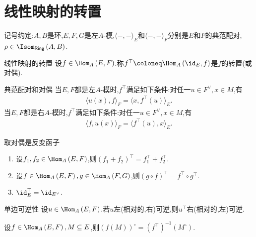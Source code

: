 \section{线性映射的转置}

记号约定:$A,B$是环,$E,F,G$是左$A$-模,$\langle -,-\rangle_{E}$和$\langle -,-\rangle_{F}$分别是$E$和$F$的典范配对,$\rho\in\Isom_{\mathsf{Ring}}\left(A,B\right)$.

\begin{definition}{线性映射的转置}{}
	设$f\in\Hom_{A}\left(E,F\right)$.称$f^{\top}\coloneq\Hom_{A}\left(\id_{E},f\right)$是$f$的转置(或对偶).
\end{definition}

\begin{remark}{典范配对和对偶}{}
	当$E,F$都是左$A$-模时,$f^{\top}$满足如下条件:对任一$u\in F^{\vee},x\in M$,有
	\begin{align*}
		\langle u\left(x\right),f\rangle_{F}=\langle x,f^{\top}\left(u\right)\rangle_{E}.
	\end{align*}
	当$E,F$都是右$A$-模时,$f^{\top}$满足如下条件:对任一$u\in F^{\vee},x\in M$,有
	\begin{align*}
		\langle f,u\left(x\right)\rangle_{F}=\langle f^{\top}\left(u\right),x\rangle_{E}.
	\end{align*}
\end{remark}

\begin{proposition}{取对偶是反变函子}{}
	\begin{enumerate}
		\item 设$f_{1},f_{2}\in\Hom_{A}\left(E,F\right)$,则$\left(f_{1}+f_{2}\right)^{\top}=f_{1}^{\top}+f_{2}^{\top}$.
		\item 设$f\in\Hom_{A}\left(E,F\right),g\in\Hom_{A}\left(F,G\right)$,则$\left(g\circ f\right)^{\top}=f^{\top}\circ g^{\top}$.
		\item $\id_{E}^{\top}=\id_{E^{\vee}}$.
	\end{enumerate}
\end{proposition}

\begin{remark}{单边可逆性}{}
	设$u\in\Hom_{A}\left(E,F\right)$.若$u$左(相对的,右)可逆,则$u^{\top}$右(相对的,左)可逆.
\end{remark}

\begin{proposition}{}{}
	设$f\in\Hom_{A}\left(E,F\right),M\subseteq E$,则$\left(f\left(M\right)\right)^{\circ}=\left(f^{\top}\right)^{-1}\left(M^{\circ}\right)$.
\end{proposition}

